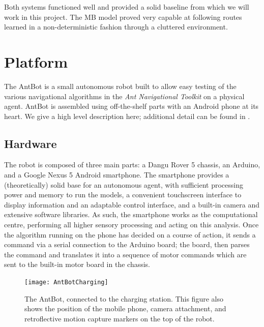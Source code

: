 \documentclass[a4paper,11pt,twoside,openright]{article}
\let\oldsection\section
\def\section{\cleardoublepage\oldsection}
\begin{document}
Both systems functioned well and provided a solid baseline from which we will
work in this project. The MB model proved very capable at following routes
learned in a non-deterministic fashion through a cluttered environment.

\newpage

\section{ Platform } \label{sec:platform}
The AntBot is a small autonomous robot built to allow easy testing of the
various navigational algorithms in the \textit{Ant Navigational Toolkit}
on a physical agent. AntBot is assembled using off-the-shelf parts with an
Android phone at its heart. We give a high level description here; additional
detail can be found in \cite{Mitchell2018}.

\subsection{ Hardware }
The robot is composed of three main parts: a Dangu Rover 5 chassis, an Arduino,
and a Google Nexus 5 Android smartphone. The smartphone provides a
(theoretically) solid base for an autonomous agent, with sufficient processing
power and memory to run the models, a convenient touchscreen interface to display
information and an adaptable control interface, and a built-in camera and
extensive software libraries. As such, the smartphone works as the computational
centre, performing all higher sensory processing and acting on this analysis.
Once the algorithm running on the phone has decided on a course of action, it
sends a command via a serial connection to the Arduino board; the board, then
parses the command and translates it into a sequence of motor commands which are
sent to the built-in motor board in the chassis.
\begin{figure}
  \centering
  \texttt{[image: AntBotCharging]}
  \caption{
    \label{fig:antbotcomp} The AntBot, connected to the charging station.
    This figure also shows the position of the mobile phone, camera attachment,
    and retroflective motion capture markers on the top of the robot.
    }
\end{figure}
\end{document}

